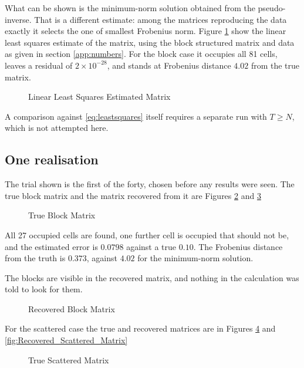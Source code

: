 What can be shown is the minimum-norm solution obtained from the pseudo-inverse. That
is a different estimate: among the matrices reproducing the data exactly it selects
the one of smallest Frobenius norm. 
Figure \ref{fig:LLSE_Matrix} show the linear least squares estimate of the matrix,
using the block structured matrix and data as given in section \ref{app:numbers}.
For the block case it occupies all 81 cells,
leaves a residual of $2 \times 10^{-28}$, and stands at Frobenius distance $4.02$ from
the true matrix.

\begin{figure}[ht]

\protect\caption{Linear Least Squares Estimated Matrix}
\label{fig:LLSE_Matrix}
\end{figure}


A comparison against \eqref{eq:leastsquares} itself requires a separate run with
$T \ge N$, which is not attempted here.

\subsection{One realisation}

The trial shown is the first of the forty, chosen before any results were seen. The
true block matrix and the matrix recovered from it are Figures
\ref{fig:True_Block_Matrix} and \ref{fig:Recovered_Block_Matrix}


\begin{figure}[ht]

\protect\caption{True Block Matrix}
\label{fig:True_Block_Matrix}
\end{figure}


All 27 occupied cells are found, one further cell is occupied that should not be, and
the estimated error is $0.0798$ against a true $0.10$. The Frobenius distance from the
truth is $0.373$, against $4.02$ for the minimum-norm solution.

The blocks are visible in the recovered matrix, and nothing in the calculation was
told to look for them.

\begin{figure}[ht]

\protect\caption{Recovered Block Matrix}
\label{fig:Recovered_Block_Matrix}
\end{figure}


For the scattered case the true and recovered matrices are in Figures
\ref{fig:True_Scattered_Matrix}
and
\ref{fig:Recovered_Scattered_Matrix}

\begin{figure}[ht]

\caption{True Scattered Matrix}
\label{fig:True_Scattered_Matrix}
\end{figure}



